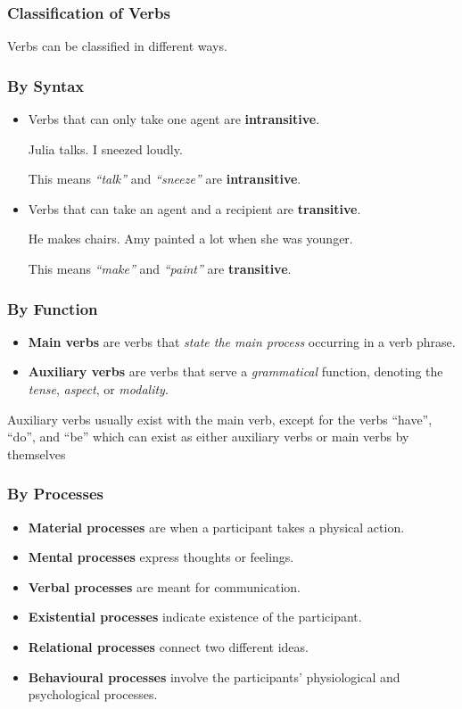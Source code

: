 \documentclass[../main.tex]{subfiles}
\begin{document}
 	\subsubsection{Classification of Verbs}
	Verbs can be classified in different ways. 
	
	\subsubsection*{By Syntax}
	\begin{itemize}
		\item Verbs that can only take one agent are \textbf{intransitive}.
		\begin{exe}
			\ex Julia talks.
			\ex I sneezed loudly.
		\end{exe}
		This means \textit{``talk''} and \textit{``sneeze''} are \textbf{intransitive}.
		\item Verbs that can take an agent and a recipient are \textbf{transitive}.
		\begin{exe}
			\ex He makes chairs.
			\ex[*] {He makes.}
			\ex Amy painted a lot when she was younger.
			\ex[*] {Amy painted.}
		\end{exe}
		This means \textit{``make''} and \textit{``paint''} are \textbf{transitive}.
	\end{itemize}
	
	\subsubsection*{By Function}
	\begin{itemize}
		\item \textbf{Main verbs} are verbs that \textit{state the main process} occurring in a verb phrase.
		\item \textbf{Auxiliary verbs} are verbs that serve a \textit{grammatical} function, denoting the \textit{tense}, \textit{aspect}, or \textit{modality}.
	\end{itemize}
	Auxiliary verbs usually exist with the main verb, except for the verbs ``have'', ``do'', and ``be'' which can exist as either auxiliary verbs or main verbs by themselves 

	\subsubsection*{By Processes}
	\begin{itemize}
		\item \textbf{Material processes} are when a participant takes a physical action.
		\item \textbf{Mental processes} express thoughts or feelings.
		\item \textbf{Verbal processes} are meant for communication.
		\item \textbf{Existential processes} indicate existence of the participant.
		\item \textbf{Relational processes} connect two different ideas.
		\item \textbf{Behavioural processes} involve the participants' physiological and psychological processes.
	\end{itemize}
\end{document}
